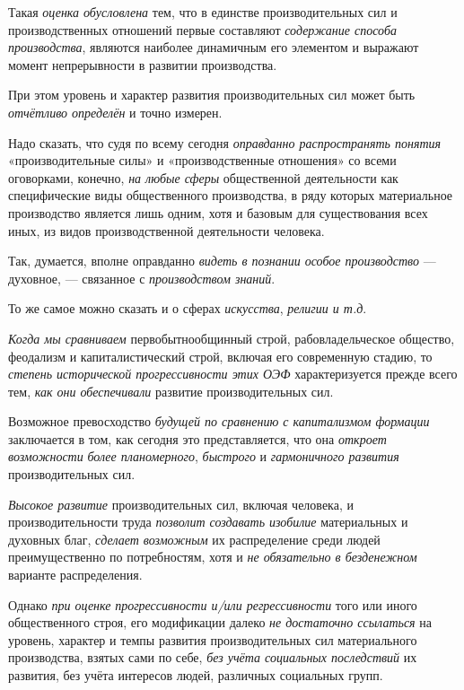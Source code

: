 \documentclass[a4paper,14pt,russian]{extreport}
\begin{document}
Такая \emph{оценка обусловлена} тем, что в единстве производительных сил и производственных отношений первые составляют \emph{содержание способа производства}, являются наиболее динамичным его элементом и выражают момент непрерывности в развитии производства.

При этом уровень и характер развития производительных сил может быть \emph{отчётливо определён} и точно измерен.

Надо сказать, что судя по всему сегодня \emph{оправданно распространять понятия} «производительные силы» и «производственные отношения» со всеми оговорками, конечно, \emph{на любые сферы} общественной деятельности как специфические виды общественного производства, в ряду которых материальное производство является лишь одним, хотя и базовым для существования всех иных, из видов производственной деятельности человека.

Так, думается, вполне оправданно \emph{видеть в познании особое производство} --- духовное, --- связанное с \emph{производством знаний}.

То же самое можно сказать и о сферах \emph{искусства}, \emph{религии и т.д}.

\emph{Когда мы сравниваем} первобытнообщинный строй, рабовладельческое общество, феодализм и капиталистический строй, включая его современную стадию, то \emph{степень исторической прогрессивности этих ОЭФ} характеризуется прежде всего тем, \emph{как они обеспечивали} развитие производительных сил.

Возможное превосходство \emph{будущей по сравнению с капитализмом формации} заключается в том, как сегодня это представляется, что она \emph{откроет возможности} \emph{более планомерного}, \emph{быстрого} и \emph{гармоничного развития} производительных сил.

\emph{Высокое развитие} производительных сил, включая человека, и производительности труда \emph{позволит создавать изобилие} материальных и духовных благ, \emph{сделает возможным} их распределение среди людей преимущественно по потребностям, хотя и \emph{не обязательно в безденежном} варианте распределения.

Однако \emph{при оценке} \emph{прогрессивности и/или регрессивности} того или иного общественного строя, его модификации далеко \emph{не достаточно ссылаться} на уровень, характер и темпы развития производительных сил материального производства, взятых сами по себе, \emph{без учёта социальных последствий} их развития, без учёта интересов людей, различных социальных групп.
\end{document}
